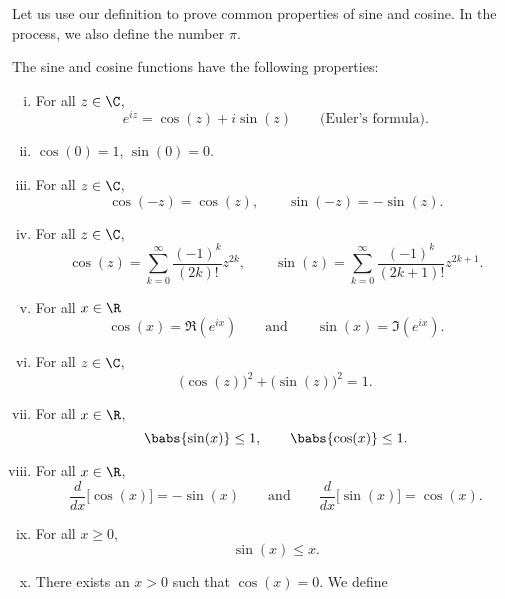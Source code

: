 Let us use our definition to prove common properties of
sine and cosine.  In the process, we also define the
number $\pi$.

\begin{prop}
The sine and cosine functions have the following properties:
\begin{enumerate}[(i)]
\item For all $z \in \C$,
\begin{equation*}
e^{iz} = \cos(z) + i\sin(z) \qquad
\text{(Euler's formula)}.
\end{equation*}
\item $\cos(0) = 1$, $\sin(0) = 0$.
\item For all $z \in \C$,
\begin{equation*}
\cos(-z) = \cos(z), \qquad
\sin(-z) = -\sin(z).
\end{equation*}
\item For all $z \in \C$,
\begin{equation*}
\cos(z) = \sum_{k=0}^\infty \frac{{(-1)}^k}{(2k)!} z^{2k} ,
\qquad
\sin(z) = \sum_{k=0}^\infty \frac{{(-1)}^k}{(2k+1)!} z^{2k+1} .
\end{equation*}
\item For all $x \in \R$
\begin{equation*}
\cos(x) = \Re (e^{ix})
\qquad\text{and}\qquad
\sin(x) = \Im (e^{ix}) .
\end{equation*}
\item For all $z \in \C$,
\begin{equation*}
{\bigl( \cos(z) \bigr)}^2 + {\bigl( \sin(z) \bigr)}^2 = 1 .
\end{equation*}
\item For all $x \in \R$,
\begin{equation*}
\babs{\sin(x)} \leq 1, \qquad \babs{\cos(x)} \leq 1 .
\end{equation*}
\item For all $x \in \R$,
\begin{equation*}
\frac{d}{dx} \bigl[ \cos(x) \bigr] = -\sin(x)
\qquad \text{and} \qquad
\frac{d}{dx} \bigl[ \sin(x) \bigr] = \cos(x) .
\end{equation*}
\item For all $x \geq 0$,
\begin{equation*}
\sin(x) \leq x .
\end{equation*}
\item
There exists an $x > 0$ such that $\cos(x) = 0$.  We define
\begin{equation*}

\end{equation*}
\end{enumerate}
\end{prop}
